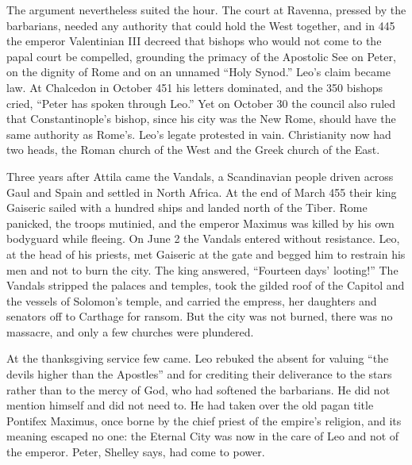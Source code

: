 The argument nevertheless suited the hour. The court at Ravenna, pressed by the barbarians, needed
any authority that could hold the West together, and in 445 the emperor Valentinian III decreed that
bishops who would not come to the papal court be compelled, grounding the primacy of the Apostolic See
on Peter, on the dignity of Rome and on an unnamed ``Holy Synod.'' Leo's claim became law. At
Chalcedon in October 451 his letters dominated, and the 350 bishops cried, ``Peter has spoken through
Leo.'' Yet on October 30 the council also ruled that Constantinople's bishop, since his city was the New Rome, should have the same authority as Rome's. Leo's legate protested in vain. Christianity now had two heads, the Roman
church of the West and the Greek church of the East.

Three years after Attila came the Vandals, a Scandinavian people driven across Gaul and Spain and
settled in North Africa. At the end of March 455 their king Gaiseric sailed with a hundred ships and
landed north of the Tiber. Rome panicked, the troops mutinied, and the emperor Maximus was killed by
his own bodyguard while fleeing. On June 2 the Vandals entered without resistance. Leo, at the head
of his priests, met Gaiseric at the gate and begged him to restrain his men and not to burn the city.
The king answered, ``Fourteen days' looting!'' The Vandals stripped the palaces and temples, took the
gilded roof of the Capitol and the vessels of Solomon's temple, and carried the empress, her daughters
and senators off to Carthage for ransom. But the city was not burned, there was no massacre, and only
a few churches were plundered.

At the thanksgiving service few came. Leo rebuked the absent for valuing ``the devils higher than the
Apostles'' and for crediting their deliverance to the stars rather than to the mercy of God, who had
softened the barbarians. He did not mention himself and did not need to. He had taken over the old pagan title Pontifex Maximus, once borne by the chief priest of the empire's religion, and its meaning escaped no one: the Eternal City was now in the care of Leo and not of the emperor. Peter, Shelley says, had come to power.

